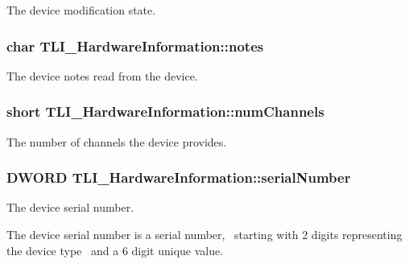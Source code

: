 The device modification state. 

\subsubsection[{\texorpdfstring{notes}{notes}}]{\setlength{\rightskip}{0pt plus 5cm}char T\+L\+I\+\_\+\+Hardware\+Information\+::notes}\hypertarget{struct_t_l_i___hardware_information_a9f969c072180e7bf58aa629ac862fa3a}{}\label{struct_t_l_i___hardware_information_a9f969c072180e7bf58aa629ac862fa3a}


The device notes read from the device. 

\subsubsection[{\texorpdfstring{num\+Channels}{numChannels}}]{\setlength{\rightskip}{0pt plus 5cm}short T\+L\+I\+\_\+\+Hardware\+Information\+::num\+Channels}\hypertarget{struct_t_l_i___hardware_information_a62318aa99077efaf363738d7b4f5f11d}{}\label{struct_t_l_i___hardware_information_a62318aa99077efaf363738d7b4f5f11d}


The number of channels the device provides. 

\subsubsection[{\texorpdfstring{serial\+Number}{serialNumber}}]{\setlength{\rightskip}{0pt plus 5cm}D\+W\+O\+RD T\+L\+I\+\_\+\+Hardware\+Information\+::serial\+Number}\hypertarget{struct_t_l_i___hardware_information_a12b5a17933bc3994f7e9528f43225027}{}\label{struct_t_l_i___hardware_information_a12b5a17933bc3994f7e9528f43225027}


The device serial number. 

The device serial number is a serial number,~\newline
starting with 2 digits representing the device type~\newline
 and a 6 digit unique value.
